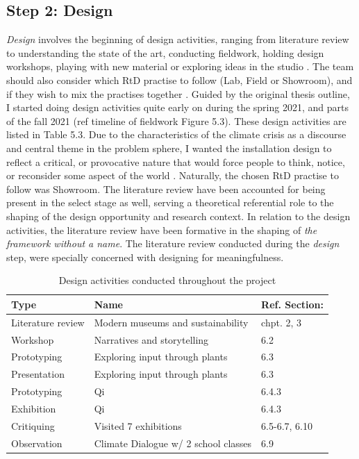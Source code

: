 \subsection{Step 2: Design}
\textit{Design} involves the beginning of design activities, ranging from literature review to understanding the state of the art, conducting fieldwork, holding design workshops, playing with new material or exploring ideas in the studio \autocite[p. 185]{zimmerman_research_2014}. The team should also consider which RtD practise to follow (Lab, Field or Showroom), and if they wish to mix the practises together \autocite[p. 185]{zimmerman_research_2014}. Guided by the original thesis outline, I started doing design activities quite early on during the spring 2021, and parts of the fall 2021 (ref timeline of fieldwork Figure 5.3). These design activities are listed in Table 5.3. Due to the characteristics of the climate crisis as a discourse and central theme in the problem sphere, I wanted the installation design to reflect a critical, or provocative nature that would force people to think, notice, or reconsider some aspect of the world \autocite[p. 173]{zimmerman_research_2014}. Naturally, the chosen RtD practise to follow was Showroom. The literature review have been accounted for being present in the select stage as well, serving a theoretical referential role to the shaping of the design opportunity and research context. In relation to the design activities, the literature review have been formative in the shaping of \emph{the framework without a name}. The literature review conducted during the \emph{design} step, were specially concerned with designing for meaningfulness.

\begin{table}[H]
\centering
\begin{tabular}{| l | l | l |}
\hline
\textbf{Type} & \textbf{Name} & \textbf{Ref. Section:} \\
\hline
Literature review & Modern museums and sustainability & chpt. 2, 3 \\
Workshop & Narratives and storytelling & 6.2 \\
Prototyping & Exploring input through plants & 6.3 \\
Presentation & Exploring input through plants & 6.3 \\
Prototyping & Qi & 6.4.3 \\
Exhibition & Qi & 6.4.3 \\
Critiquing & Visited 7 exhibitions & 6.5-6.7, 6.10 \\
Observation & Climate Dialogue w/ 2 school classes & 6.9 \\
\hline
\end{tabular}
\caption{Design activities conducted throughout the project}
\end{table}

